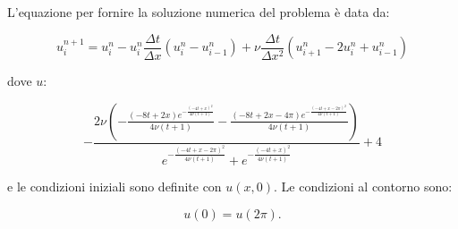 \noindent
L’equazione per fornire la soluzione numerica del problema è data da: 

\begin{equation}
u_i^{n+1} = u_i^n - u_i^n \frac{\Delta t}{\Delta x} (u_i^n - u_{i-1}^n) + \nu \frac{\Delta t}{\Delta x^2}(u_{i+1}^n - 2u_i^n + u_{i-1}^n)
\end{equation}

\noindent
dove $u$: 

\begin{equation}
- \frac{2\nu\left(-\frac{(-8t + 2x) e^{-\frac{(-4t + x)^2}{4\nu(t + 1)}}}{4\nu(t + 1)} - \frac{(-8t + 2x - 4\pi) e^{-\frac{(-4t + x - 2\pi)^2}{4\nu(t + 1)}}}{4\nu(t + 1)} \right)}{e^{-\frac{(-4t + x - 2\pi)^2}{4\nu(t + 1)}} + e^{-\frac{(-4t + x)^2}{4\nu(t + 1)}}} + 4
\end{equation}

\noindent
e le condizioni iniziali sono definite con $u(x, 0)$. Le condizioni al contorno sono: 

\begin{equation}
u(0) = u(2\pi).
\end{equation}


